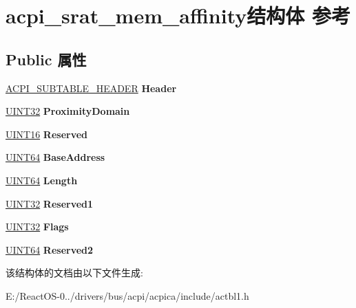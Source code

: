 \hypertarget{structacpi__srat__mem__affinity}{}\section{acpi\+\_\+srat\+\_\+mem\+\_\+affinity结构体 参考}
\label{structacpi__srat__mem__affinity}
\subsection*{Public 属性}
\begin{DoxyCompactItemize}
\item 
\mbox{\label{structacpi__srat__mem__affinity_af9be034b63c670287ed034a8972bb7b4}} 
\hyperlink{structacpi__subtable__header}{A\+C\+P\+I\+\_\+\+S\+U\+B\+T\+A\+B\+L\+E\+\_\+\+H\+E\+A\+D\+ER} {\bfseries Header}
\item 
\mbox{\label{structacpi__srat__mem__affinity_ab405d653fe1c11e116eae0834dcafdc9}} 
\hyperlink{_processor_bind_8h_ae1e6edbbc26d6fbc71a90190d0266018}{U\+I\+N\+T32} {\bfseries Proximity\+Domain}
\item 
\mbox{\label{structacpi__srat__mem__affinity_a1aa7129c37d7c96e4a46db1d027025b5}} 
\hyperlink{_processor_bind_8h_a09f1a1fb2293e33483cc8d44aefb1eb1}{U\+I\+N\+T16} {\bfseries Reserved}
\item 
\mbox{\label{structacpi__srat__mem__affinity_a201c2324cc37c4a7ab45b478c8ffa3dd}} 
\hyperlink{_processor_bind_8h_a57be03562867144161c1bfee95ca8f7c}{U\+I\+N\+T64} {\bfseries Base\+Address}
\item 
\mbox{\label{structacpi__srat__mem__affinity_a0c0ea8d9c8380d5639a8e723b017fb8b}} 
\hyperlink{_processor_bind_8h_a57be03562867144161c1bfee95ca8f7c}{U\+I\+N\+T64} {\bfseries Length}
\item 
\mbox{\label{structacpi__srat__mem__affinity_a44b4550984972c5c64f346194a4516f0}} 
\hyperlink{_processor_bind_8h_ae1e6edbbc26d6fbc71a90190d0266018}{U\+I\+N\+T32} {\bfseries Reserved1}
\item 
\mbox{\label{structacpi__srat__mem__affinity_a24201f1121a471b70e0508cb8cf38afb}} 
\hyperlink{_processor_bind_8h_ae1e6edbbc26d6fbc71a90190d0266018}{U\+I\+N\+T32} {\bfseries Flags}
\item 
\mbox{\label{structacpi__srat__mem__affinity_a099da59b78aa2447748298ab8dad18af}} 
\hyperlink{_processor_bind_8h_a57be03562867144161c1bfee95ca8f7c}{U\+I\+N\+T64} {\bfseries Reserved2}
\end{DoxyCompactItemize}


该结构体的文档由以下文件生成\+:\begin{DoxyCompactItemize}
\item 
E\+:/\+React\+O\+S-\/0../drivers/bus/acpi/acpica/include/actbl1.\+h\end{DoxyCompactItemize}
